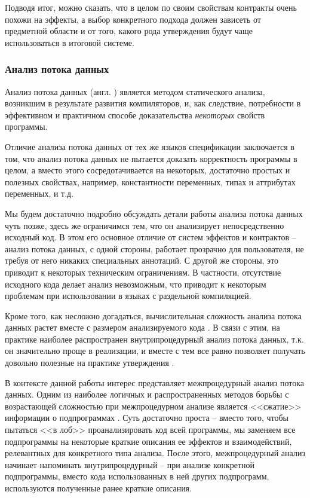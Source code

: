 Подводя итог, можно сказать, что в целом по своим свойствам контракты очень похожи на эффекты, а выбор конкретного подхода должен зависеть от предметной области и от того, какого рода утверждения будут чаще использоваться в итоговой системе. 






\subsubsection{Анализ потока данных}

Анализ потока данных (англ. ) является методом статического анализа, возникшим в результате развития компиляторов, и, как следствие, потребности в эффективном и практичном способе доказательства \emph{некоторых} свойств программы.

Отличие анализа потока данных от тех же языков спецификации заключается в том, что анализ потока данных не пытается доказать корректность программы в целом, а вместо этого сосредотачивается на некоторых, достаточно простых и полезных свойствах, например, константности переменных, типах и аттрибутах переменных, и т.д. \cite{Sharir78}

Мы будем достаточно подробно обсуждать детали работы анализа потока данных чуть позже, здесь же ограничимся тем, что он анализирует непосредственно исходный код. В этом его основное отличие от систем эффектов и контрактов -- анализ потока данных, с одной стороны, работает прозрачно для пользователя, не требуя от него никаких специальных аннотаций. С другой же стороны, это приводит к некоторых техническим ограничениям. В частности, отсутствие исходного кода делает анализ невозможным, что приводит к некоторым проблемам при использовании в языках с раздельной компиляцией.

Кроме того, как несложно догадаться, вычислительная сложность анализа потока данных растет вместе с размером анализируемого кода \cite{Sagiv96}. В связи с этим, на практике наиболее распространен внутрипроцедурный анализ потока данных, т.к. он значительно проще в реализации, и вместе с тем все равно позволяет получать довольно полезные на практике утверждения \cite{dragon-book}.

В контексте данной работы интерес представляет межпроцедурный анализ потока данных. Одним из наиболее логичных и распространенных методов борьбы с возрастающей сложностью при межпроцедурном анализе является <<сжатие>> информации о подпрограммах \cite{Weihl80, Barth78}. Суть достаточно проста -- вместо того, чтобы пытаться <<в лоб>> проанализировать код всей программы, мы заменяем все подпрограммы на некоторые краткие описания ее эффектов и взаимодействий, релевантных для конкретного типа анализа. После этого, межпроцедурный анализ начинает напоминать внутрипроцедурный -- при анализе конкретной подпрограммы, вместо кода использованных в ней других подпрограмм, используются полученные ранее краткие описания.

